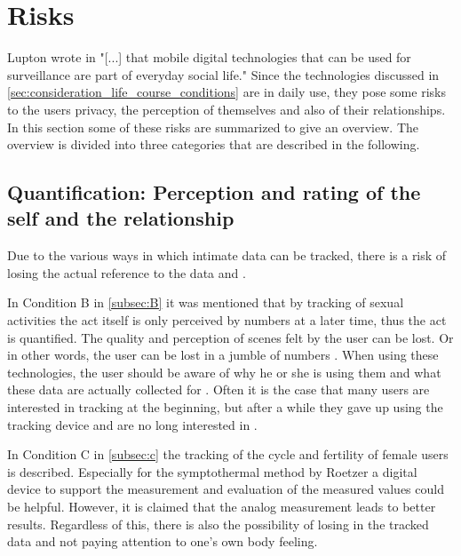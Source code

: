 \section{Risks}
\label{sec:risks}
Lupton wrote in \cite{doi:10.1080/13691058.2014.920528} "[...] that mobile digital technologies that can be used for surveillance are part of everyday social life."
Since the technologies discussed in \ref{sec:consideration_life_course_conditions} are in daily use, they pose some risks to the users privacy, the perception of themselves and also of their relationships.
In this section some of these risks are summarized to give an overview.
The overview is divided into three categories that are described in the following.

\subsection{Quantification: Perception and rating of the self and the relationship}
Due to the various ways in which intimate data can be tracked, there is a risk of losing the actual reference to the data \cite{doi:10.1080/13691058.2014.920528} and \cite{lupton2016quantified}.

In Condition B in \ref{subsec:B} it was mentioned that by tracking of sexual activities the act itself is only perceived by numbers at a later time, thus the act is quantified. The quality and perception of scenes felt by the user can be lost. Or in other words, the user can be lost in a jumble of numbers \cite{kelly2017inevitable}.
When using these technologies, the user should be aware of why he or she is using them and what these data are actually collected for \cite{doi:10.1080/15265161.2017.1409823}. 
Often it is the case that many users are interested in tracking at the beginning, but after a while they gave up using the tracking device and are no long interested in \cite{sjoklint2015complexities}.

In Condition C in \ref{subsec:c} the tracking of the cycle and fertility of female users is described. 
Especially for the symptothermal method by Roetzer a digital device to support the measurement and evaluation of the measured values could be helpful. However, it is claimed that the 
analog measurement leads to better results. %
Regardless of this, there is also the possibility of losing in the tracked data and not paying attention to one's own body feeling.

